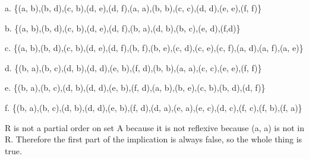 \documentclass[12pt]{article}
\begin{document}
a. \{(a, b),(b, d),(c, b),(d, e),(d, f),(a, a),(b, b),(c, c),(d, d),(e, e),(f, f)\}

b. \{(a, b),(b, d),(c, b),(d, e),(d, f),(b, a),(d, b),(b, c),(e, d),(f,d)\}

c. \{(a, b),(b, d),(c, b),(d, e),(d, f),(b, f),(b, e),(c, d),(c, e),(c, f),(a, d),(a, f),(a, e)\}

d. \{(b, a),(b, c),(d, b),(d, d),(e, b),(f, d),(b, b),(a, a),(c, c),(e, e),(f, f)\} 

e. \{(b, a),(b, c),(d, b),(d, d),(e, b),(f, d),(a, b),(b, e),(c, b),(b, d),(d, f)\} 

f. \{(b, a),(b, c),(d, b),(d, d),(e, b),(f, d),(d, a),(e, a),(e, c),(d, c),(f, c),(f, b),(f, a)\} 

R is not a partial order on set A because it is not reflexive because (a, a) is not in R. Therefore the first part of the implication is always false, so the whole thing is true.
\end{document}
